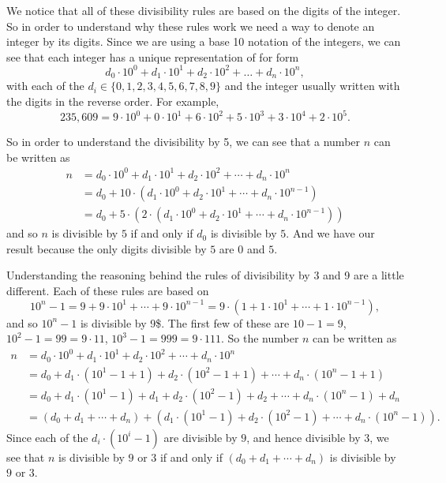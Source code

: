\documentclass[
]{book}
\theoremstyle{definition}
\theoremstyle{definition}
\theoremstyle{definition}
\theoremstyle{definition}
\theoremstyle{remark}
\begin{document}
We notice that all of these divisibility rules are based on the digits of the integer. So in order to understand why these rules work we need a way to denote an integer by its digits. Since we are using a base 10 notation of the integers, we can see that each integer has a unique representation of for form \[d_0 \cdot 10^0 + d_1 \cdot 10^1 + d_2 \cdot 10^2+ \ldots + d_n \cdot 10^n,\] with each of the \(d_i\in \{0,1,2,3,4,5,6,7,8,9\}\) and the integer usually written with the digits in the reverse order. For example, \[235,609 = 9\cdot 10^0 + 0\cdot 10^1 + 6 \cdot 10^2 + 5 \cdot 10^3 + 3 \cdot 10^4 + 2 \cdot 10^5.\]

So in order to understand the divisibility by 5, we can see that a number \(n\) can be written as
\begin{align*}
n &= d_0 \cdot 10^0 + d_1 \cdot 10^1 + d_2 \cdot 10^2+ \cdots + d_n \cdot 10^n \\
&= d_0 + 10 \cdot \left(d_1 \cdot 10^0 + d_2 \cdot 10^1+ \cdots + d_n \cdot 10^{n-1}\right) \\
&= d_0 + 5\cdot \left(2\cdot \left(d_1 \cdot 10^0 + d_2 \cdot 10^1+ \cdots + d_n \cdot 10^{n-1}\right) \right)
\end{align*}
and so \(n\) is divisible by \(5\) if and only if \(d_0\) is divisible by \(5\). And we have our result because the only digits divisible by \(5\) are \(0\) and \(5\).

Understanding the reasoning behind the rules of divisibility by 3 and 9 are a little different. Each of these rules are based on \[10^n -1 = 9+9\cdot 10^1 + \cdots + 9\cdot 10^{n-1}= 9\cdot \left(1+1\cdot 10^1 + \cdots + 1\cdot 10^{n-1}\right),\] and so \(10^n-1\) is divisible by 9\$. The first few of these are \(10-1=9\), \(10^2-1=99=9\cdot 11\), \(10^3-1=999=9\cdot 111\). So the number \(n\) can be written as
\begin{align*}
n &= d_0 \cdot 10^0 + d_1 \cdot 10^1 + d_2 \cdot 10^2+ \cdots + d_n \cdot 10^n \\
&= d_0 + d_1 \cdot (10^1 -1 +1) + d_2 \cdot (10^2-1+1) + \cdots + d_n \cdot (10^n-1+1) \\
&= d_0 + d_1 \cdot (10^1-1) + d_1 + d_2 \cdot (10^2-1) + d_2 + \cdots + d_n \cdot (10^n-1) + d_n \\
&= \left(d_0 + d_1+ \cdots + d_n \right) + \left(  d_1 \cdot (10^1-1) + d_2 \cdot (10^2-1) + \cdots + d_n \cdot (10^n-1) \right).
\end{align*}
Since each of the \(d_i \cdot(10^i-1)\) are divisible by \(9\), and hence divisible by \(3\), we see that \(n\) is divisible by \(9\) or \(3\) if and only if \(\left(d_0 + d_1+ \cdots + d_n \right)\) is divisible by \(9\) or \(3\).
\end{document}
